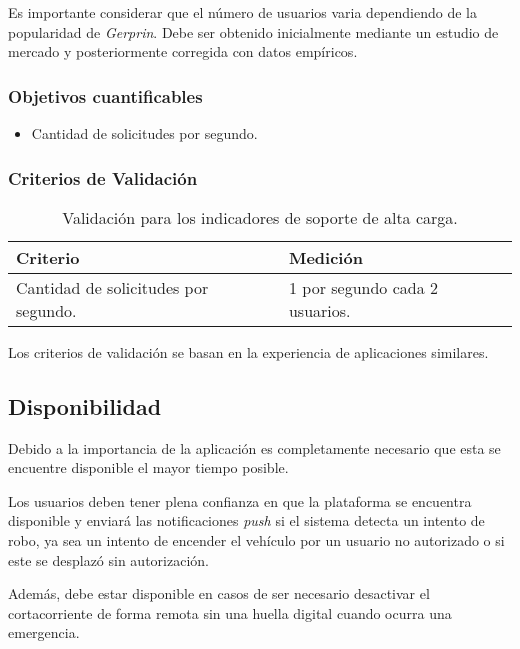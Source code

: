 Es importante considerar que el número de usuarios varia dependiendo de la popularidad de \textit{Gerprin}. Debe ser obtenido inicialmente mediante un estudio de mercado y posteriormente corregida con datos empíricos.


\subsubsection{Objetivos cuantificables}

\begin{itemize}
	\item
	Cantidad de solicitudes por segundo.
\end{itemize}

\subsubsection{Criterios de Validación}

\begin{table}[H]
    \caption[Validación para los indicadores de soporte de alta carga.] {Validación para los indicadores de soporte de alta carga.}
    \label{tbl:Criterios de Validación soporte de alta carga}
    \begin{tabular}{|p{}|p{}|}
        \hline
        \textbf{Criterio} &  \textbf{Medición}\\
    	\hline
    	\hline
    	Cantidad de solicitudes por segundo.  & 1 por segundo cada 2 usuarios.  \\ \hline
    \end{tabular}
\end{table}
Los criterios de validación se basan en la experiencia de aplicaciones similares.

\subsection{Disponibilidad}

Debido a la importancia de la aplicación es completamente necesario que esta se encuentre disponible el mayor tiempo posible.

Los usuarios deben tener plena confianza en que la plataforma se encuentra disponible y enviará las notificaciones \textit{push} si el sistema detecta un intento de robo, ya sea un intento de encender el vehículo por un usuario no autorizado o si este se desplazó sin autorización.

Además, debe estar disponible en casos de ser necesario desactivar el cortacorriente de forma remota sin una huella digital cuando ocurra una emergencia.

